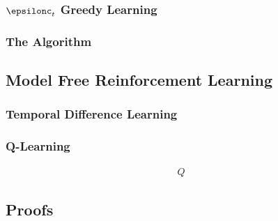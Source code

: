           \subsubsection{$\epsilonc_{t}$ Greedy Learning}\label{subsubsec:reinforcement_epsilonc_greedy_algorithm}
            
          \subsubsection{The  Algorithm}\label{subsubsec:reinforcement_rmax_algorithm}
            
            \label{subsubsubsec:how_many_transitions_do_we_need?}
              
      \vfill\columnbreak
      \subsection{Model Free Reinforcement Learning}\label{subsec:model_based_reinforcement_learning}
        
        \subsubsection{Temporal Difference Learning }\label{subsubsec:temporal_difference_learning_td}
          
        \subsubsection{Q-Learning}\label{subsubsec:q-learning}
        \begin{defnbox}\nospacing
          \begin{defn}\label{defn:action_value_function}
            \begin{align}
              Q
            \end{align}
          \end{defn}
        \end{defnbox}

        \label{subsubsubsec:policy_gradients}
        \label{subsubsubsec:actor-critic_methods}

      \subsection{Proofs}\label{subsec:proofs}
        

